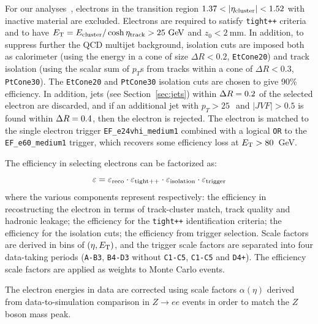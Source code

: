 For our analyses~\cite{topcommon2013}, electrons in the transition region $1.37<|\eta_{\rm cluster}| <1.52$
with inactive material are excluded. Electrons are required to satisfy \texttt{tight++} criteria and to
 have $\et = E_{\rm cluster}/\cosh\eta_{\rm track} > 25\gev$ and $z_0<2~$mm.
In addition, to suppress further the QCD multijet background, 
isolation cuts are imposed both as calorimeter (using the energy in a cone of size $\Delta R<0.2$, \texttt{EtCone20})
and track isolation (using the scalar sum of $p_T$s from tracks within a cone of $\Delta R<0.3$, \texttt{PtCone30}).
The \texttt{EtCone20} and \texttt{PtCone30} isolation cuts are chosen to give
90\% efficiency.
In addition, jets (see Section~\ref{sec:jets}) within $\dr =0.2$ of the selected electron are 
discarded, and if an additional jet with $p_T>25~$\gev\  and $|JVF|>0.5$ is found within $\dr =0.4$,
then the electron is rejected.
The electron is matched to the single electron trigger \texttt{EF\_e24vhi\_medium1}
combined with a logical \texttt{OR} to the \texttt{EF\_e60\_medium1} trigger, which
recovers some efficiency loss at $\ET > 80$~GeV.

The efficiency in selecting electrons can be factorized as:
\begin{equation}\label{eq:eleeff}
\varepsilon = \varepsilon_{\rm reco} \cdot\varepsilon_{\rm tight++} \cdot\varepsilon_{\rm isolation} \cdot\varepsilon_{\rm trigger} 
	\end{equation}
where the various components represent respectively: the efficiency in recostructing the electron 
in terms of track-cluster match, track quality and hadronic leakage; the efficiency
for the \texttt{tight++} identification criteria; the efficiency for the isolation cuts;
the efficiency from trigger selection. Scale factors are derived in bins of $(\eta, \ET)$,
and the trigger scale factors are separated into four data-taking periods 
(\texttt{A-B3}, \texttt{B4-D3} without \texttt{C1-C5}, \texttt{C1-C5} and \texttt{D4+}).
The efficiency scale factors are applied as weights to Monte Carlo events.

The electron energies in data are corrected using scale factors $\alpha(\eta)$ derived
from data-to-simulation comparison in $Z\to ee$ events in order to match the $Z$ boson 
mass peak.

